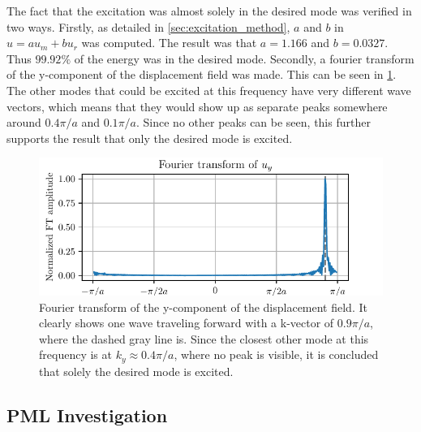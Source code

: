 The fact that the excitation was almost solely in the desired mode was verified
in two ways.
Firstly, as detailed in \cref{sec:excitation_method}, $a$ and $b$ in $u = a u_m
+ b u_r$ was computed.
The result was that $a = 1.166$ and $b = 0.0327$.
Thus $99.92\%$ of the energy was in the desired mode.
Secondly, a fourier transform of the y-component of the displacement field was
made.
This can be seen in \cref{fig:v_ft}.
The other modes that could be excited at this frequency have very different wave
vectors, which means that they would show up as separate peaks somewhere around
$0.4 \pi / a$ and $0.1 \pi / a$.
Since no other peaks can be seen, this further supports the result that only the
desired mode is excited.

\begin{figure}[htpb]
	\centering
	\includegraphics{chapters/results/ft_figure.pdf}
	\caption{%
		Fourier transform of the y-component of the displacement field.
		It clearly shows one wave traveling forward with a k-vector of
		$0.9 \pi / a$, where the dashed gray line is.
		Since the closest other mode at this frequency is at
		$k_y \approx 0.4 \pi / a$, where no peak is visible, it is concluded
		that solely the desired mode is excited.
	}%
	\label{fig:v_ft}
\end{figure}

\subsection{PML Investigation}

